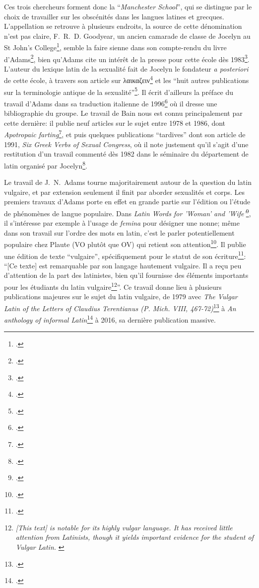Ces trois chercheurs forment donc la \enquote{\textit{Manchester School}}, qui se distingue par le choix de travailler sur les obscénités dans les langues latines et grecques. L'appellation se retrouve à plusieurs endroits, la source de cette dénomination n'est pas claire, F.~R.~D. Goodyear, un ancien camarade de classe de Jocelyn au St John's College\footcite[p.~282]{adams_henry_2003}, semble la faire sienne dans son compte-rendu du livre d'Adams\footcite{goodyear_praefanda_1985}, bien qu'Adams cite un intérêt de la presse pour cette école dès 1983\footcite[p.~289]{adams_henry_2003}. L'auteur du lexique latin de la sexualité fait de Jocelyn le fondateur \textit{a posteriori} de cette école, à travers son article sur λαικαζειν\footcite{jocelyn_greek_1980} et les \enquote{huit autres publications sur la terminologie antique de la sexualité}\footcite[p.~290]{adams_henry_2003}. Il écrit d'ailleurs la préface du travail d'Adams dans sa traduction italienne de 1996\footcite{adams1996vocabolario} où il dresse une bibliographie du groupe. Le travail de Bain nous est connu principalement par cette dernière: il publie neuf articles sur le sujet entre 1978 et 1986, dont \textit{Apotropaic farting}\footcite{bain1986apotropaic}, et puis quelques publications \enquote{tardives} dont son article de 1991, \textit{Six Greek Verbs of Sexual Congress}, où il note justement qu'il s'agit d'une restitution d'un travail commenté dès 1982 dans le séminaire du département de latin organisé par Jocelyn\footcite{bain_six_1991}. 

Le travail de J.~N.~Adams tourne majoritairement autour de la question du latin vulgaire, et par extension seulement il finit par aborder sexualités et corps. Les premiers travaux d'Adams porte en effet en grande partie sur l'édition ou l'étude de phénomènes de langue populaire. Dans \textit{Latin Words for 'Woman' and 'Wife'}\footcite{adams1972latin}, il s'intéresse par exemple à l'usage de \textit{femina} pour désigner une nonne; même dans son travail sur l'ordre des mots en latin, c'est le parler potentiellement populaire chez Plaute (VO plutôt que OV) qui retient son attention\footcite[p.~95]{adams_typological_1976}. Il publie une édition de texte \enquote{vulgaire}, spécifiquement pour le statut de son écriture\footcite{adams_text_1976}: \enquote{[Ce texte] est remarquable par son langage hautement vulgaire. Il a reçu peu d'attention de la part des latinistes, bien qu'il fournisse des éléments importants pour les étudiants du latin vulgaire\footnote{\textit{[This text] is notable for its highly vulgar language. It has received little attention from Latinists, though it yields important evidence for the student of Vulgar Latin.} \textcite[p.~2]{adams1976text}}}. Ce travail donne lieu à plusieurs publications majeures sur le sujet du latin vulgaire, de 1979 avec \textit{The Vulgar Latin of the Letters of Claudius Terentianus (P. Mich. VIII, 467-72)}\footcite{adams_vulgar_1977} à \textit{An anthology of informal Latin}\footcite{adams2016anthology} à 2016, sa dernière publication massive.

